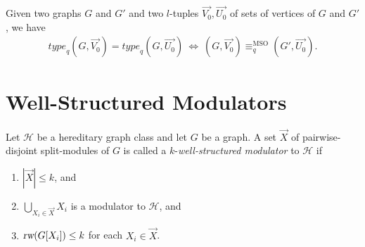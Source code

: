 \documentclass{llncs}
\newcommand{\hy}{\hbox{-}\nobreak\hskip0pt}
\def\hy{\hbox{-}\nobreak\hskip0pt}
\newcommand{\MSO}{\mbox{MSO}\xspace}
\def\HH{{\mathcal H}}
\def\wsm{well-structured modulator}
\newcommand{\rw}{\text{\normalfont\slshape rw}}
\begin{document}
{\begin{theorem}\label{thm:msogames} Given two graphs $G$ and $G'$ and two $l$\hy tuples $\vec{V_0}, \vec{U_0}$ of sets of vertices of $G$ and $G'$, we have \begin{align*}
    \mathit{type}_q(G, \vec{V_0}) = \mathit{type}_q(G, \vec{U_0}) \:
    \Leftrightarrow \: (G, \vec{V_0}) \equiv^{\MSO}_q (G', \vec{U_0}).
\end{align*}
\end{theorem}}

\lv{\MSOgames}


\section{Well-Structured Modulators}\label{sec:wsm}

\begin{definition}
\label{def:wsm}
Let $\HH$ be a hereditary graph class and let $G$ be a graph. A set $\vec{X}$ of pairwise-disjoint split-modules of $G$ is called a $k$-\emph{\wsm}{} to $\HH$ if
\begin{enumerate}
\item $|\vec{X}|\leq k$, and
\item $\bigcup_{X_i\in \vec{X}} X_i$ is a modulator to $\HH$, and
\item $\rw(G[X_i])\leq k$ for each $X_i\in \vec{X}$.
\end{enumerate}
\end{definition}
\end{document}
